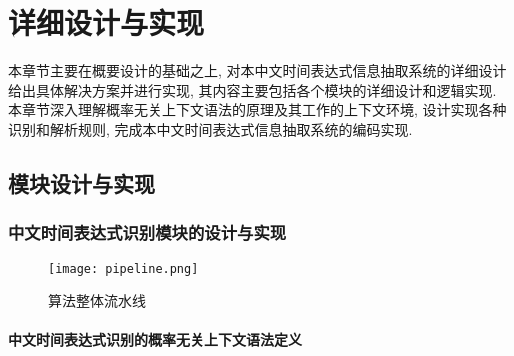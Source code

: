 
\chapter{详细设计与实现}

本章节主要在概要设计的基础之上, 对本中文时间表达式信息抽取系统的详细设计给出具体解决方案并进行实现, 其内容主要包括各个模块的详细设计和逻辑实现.
本章节深入理解概率无关上下文语法的原理及其工作的上下文环境, 设计实现各种识别和解析规则, 完成本中文时间表达式信息抽取系统的编码实现.

\section{模块设计与实现}

\subsection{中文时间表达式识别模块的设计与实现}

\begin{figure}[h]
    \centering
    \texttt{[image: pipeline.png]}
    \caption{算法整体流水线}
    \label{fig:badge}
\end{figure}

\subsubsection{中文时间表达式识别的概率无关上下文语法定义}

